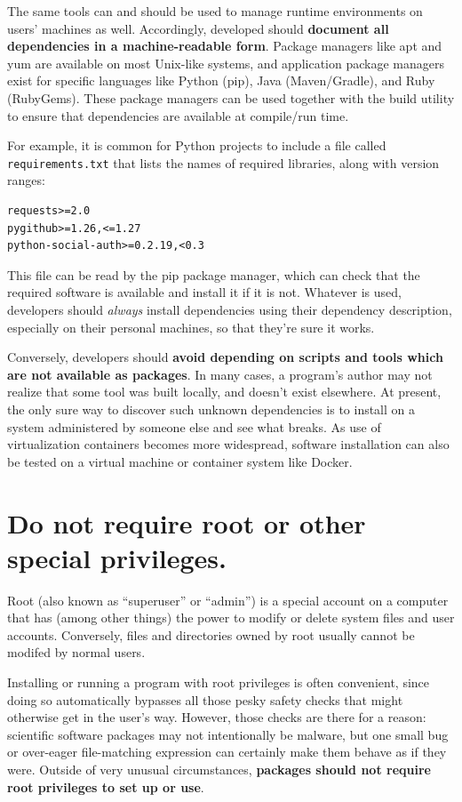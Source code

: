 \documentclass[10pt,letterpaper]{article}
\begin{document}
The same tools can and should be used to manage runtime environments on users' machines as well.
Accordingly,
developed should
\textbf{document all dependencies in a machine-readable form}.
Package managers like apt and yum are available on most Unix-like systems, and
application package managers exist for specific languages like Python (pip),
Java (Maven/Gradle), and Ruby (RubyGems). These package managers can be used
together with the build utility to ensure that dependencies are available at
compile/run time.

For example, it is common for Python projects to include a file called
\texttt{requirements.txt} that lists the names of required libraries,
along with version ranges:

\begin{verbatim}
requests>=2.0
pygithub>=1.26,<=1.27
python-social-auth>=0.2.19,<0.3
\end{verbatim}

This file can be read by the pip package manager, which can check that the
required software is available and install it if it is not. 
Whatever is used,
developers should \emph{always} install dependencies
using their dependency description, especially on their personal machines, so that
they're sure it works.

Conversely, developers should
\textbf{avoid depending on scripts and tools which are not available as packages}.
In many cases, a program's author may not realize that some tool was built locally, and
doesn't exist elsewhere. At present, the only sure way to discover such
unknown dependencies is to install on a system administered by someone
else and see what breaks. As use of virtualization containers becomes more
widespread, software installation can also be tested on a virtual machine or
container system like Docker.

\section{Do not require root or other special privileges.}

Root (also known as ``superuser'' or ``admin'') is a special account on
a computer that has (among other things) the power to modify or delete
system files and user accounts. Conversely, files and directories owned
by root usually cannot be modifed by normal users.

Installing or running a program with root privileges is often
convenient, since doing so automatically bypasses all those pesky safety
checks that might otherwise get in the user's way. However, those checks
are there for a reason: scientific software packages may not
intentionally be malware, but one small bug or over-eager file-matching
expression can certainly make them behave as if they were. Outside of
very unusual circumstances,
\textbf{packages should not require root privileges to set up or use}.
\end{document}
